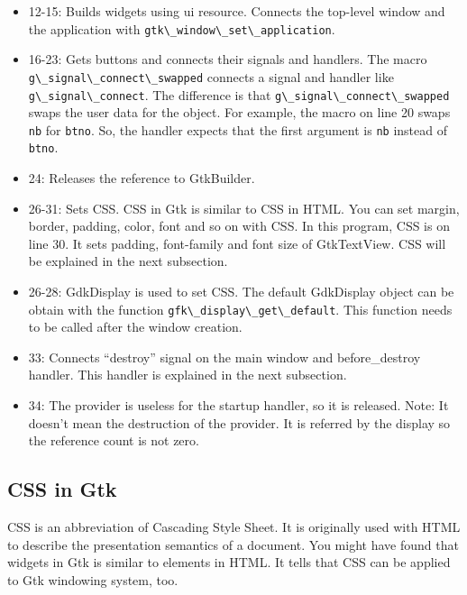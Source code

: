 \begin{itemize}
\tightlist
\item
  12-15: Builds widgets using ui resource. Connects the top-level window
  and the application with
  \passthrough{\lstinline!gtk\_window\_set\_application!}.
\item
  16-23: Gets buttons and connects their signals and handlers. The macro
  \passthrough{\lstinline!g\_signal\_connect\_swapped!} connects a
  signal and handler like \passthrough{\lstinline!g\_signal\_connect!}.
  The difference is that
  \passthrough{\lstinline!g\_signal\_connect\_swapped!} swaps the user
  data for the object. For example, the macro on line 20 swaps
  \passthrough{\lstinline!nb!} for \passthrough{\lstinline!btno!}. So,
  the handler expects that the first argument is
  \passthrough{\lstinline!nb!} instead of
  \passthrough{\lstinline!btno!}.
\item
  24: Releases the reference to GtkBuilder.
\item
  26-31: Sets CSS. CSS in Gtk is similar to CSS in HTML. You can set
  margin, border, padding, color, font and so on with CSS. In this
  program, CSS is on line 30. It sets padding, font-family and font size
  of GtkTextView. CSS will be explained in the next subsection.
\item
  26-28: GdkDisplay is used to set CSS. The default GdkDisplay object
  can be obtain with the function
  \passthrough{\lstinline!gfk\_display\_get\_default!}. This function
  needs to be called after the window creation.
\item
  33: Connects ``destroy'' signal on the main window and before\_destroy
  handler. This handler is explained in the next subsection.
\item
  34: The provider is useless for the startup handler, so it is
  released. Note: It doesn't mean the destruction of the provider. It is
  referred by the display so the reference count is not zero.
\end{itemize}

\subsection{CSS in Gtk}\label{css-in-gtk}

CSS is an abbreviation of Cascading Style Sheet. It is originally used
with HTML to describe the presentation semantics of a document. You
might have found that widgets in Gtk is similar to elements in HTML. It
tells that CSS can be applied to Gtk windowing system, too.

